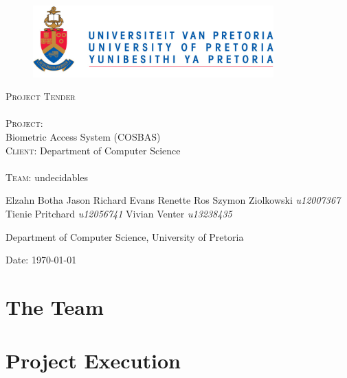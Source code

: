 \documentclass[12pt]{article}
\begin{document}
\begin{titlepage}
	\begin{center}
		
		\begin{figure}[t]
			\centering
			\includegraphics[width=350px]{UP_Logo.png}
		\end{figure}
		
		\textsc{\Huge Project Tender} \\ 

		\textsc{\huge \\Project:\\	}
		\huge Biometric Access System (COSBAS) 
		\textsc{\Large \\Client:}
		\large Department of Computer Science \\

		\textsc{\huge \\ Team:}
		\huge \textsc{}undecidables\textsc{}
		\begin{flushright} \large
			Elzahn Botha 		\emph{} \newline
			Jason Richard Evans	\emph{} \newline
			Renette Ros			\emph{} \newline
			Szymon Ziolkowski	\emph{u12007367} \newline
			Tienie Pritchard 	\emph{u12056741} \newline
			Vivian Venter 		\emph{u13238435} \newline
		\end{flushright}
		\small Department of Computer Science, University of Pretoria \\

	\vfill

	{\large Date: \today}		
		
		
	\end{center}
\end{titlepage}

\newpage
\tableofcontents

\pagebreak

\section{The Team}


\section{Project Execution}

\end{document}
